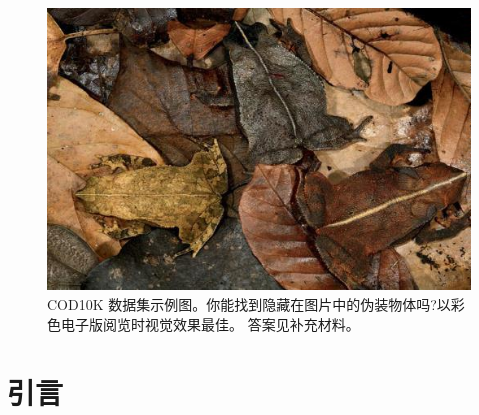 \documentclass[final]{cvpr}
\begin{document}
\begin{figure}[tp]
{\begin{minipage}[htbp]{.18\linewidth}
        \includegraphics[scale=0.25]{COD_Zh_translate/figures/example5.png}
        \hspace{5mm} %
    \end{minipage}
}
\caption{COD10K 数据集示例图。你能找到隐藏在图片中的伪装物体吗?以彩色电子版阅览时视觉效果最佳。 答案见补充材料。}
\label{fig:COD10K_examples}
\end{figure}





\begin{abstract}

\end{abstract}



\section{引言}\label{sec:Introduction}

\end{document}
